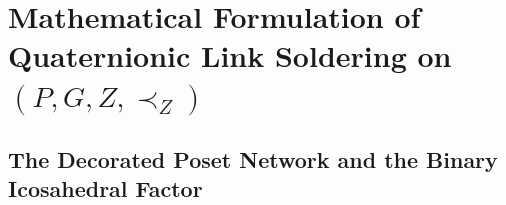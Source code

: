 \documentclass[11pt,a4paper]{article}
\theoremstyle{definition}
\theoremstyle{remark}
\begin{document}
\begin{abstract}
both $N = 81$ curvature-defect networks and coordinate-free Kleitman--Rothschild melted posets ($N \in \{80, 120, 160, 200\}$) that global $4\text{D}$ coordinates are reconstructed with $90.3\%\text{--}93.1\%$ light-cone fidelity ($87.5\%\text{--}92.2\%$ causal-and-spatial soldering fidelity) and a $1.8\times$ reduction in spatial harmonic strain relative to the initial pancake.
\end{abstract}

\newpage
\setcounter{tocdepth}{1}
\tableofcontents

\section{Mathematical Formulation of Quaternionic Link Soldering on \texorpdfstring{$(P, G, Z, \prec_Z)$}{(P, G, Z, <Z)}}
\label{sec:math_soldering}

\subsection{The Decorated Poset Network and the Binary Icosahedral Factor}
\end{document}
